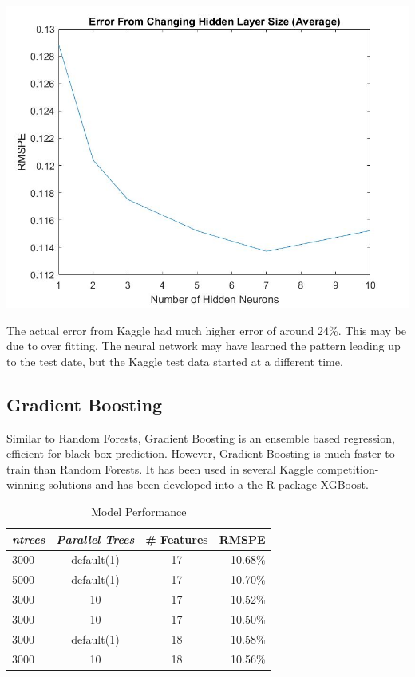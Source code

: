 \documentclass[twoside]{article}
\newenvironment{Figure}
{\par\medskip\noindent\minipage{\linewidth}}
{\endminipage\par\medskip}
\begin{document}
\begin{multicols}{2}
\begin{Figure}
    \centering
    \includegraphics[width=\linewidth]{images/hiddenAverageForceZero.jpg}
    \label{fig:RNNErrorForceZero}
\end{Figure}

The actual error from Kaggle had much higher error of around 24\%. This may be due to over fitting. The neural network may have learned the pattern leading up to the test date, but the Kaggle test data started at a different time.

\subsection{Gradient Boosting}
\indent \indent Similar to Random Forests, Gradient Boosting is an ensemble based regression, efficient for black-box prediction. However, Gradient Boosting is much faster to train than Random Forests. It has been used in several Kaggle competition-winning solutions and has been developed into a the R package XGBoost. \\
\begin{table}[H]
\caption{Model Performance}
\begin{tabular}{lccr}
\toprule
\cmidrule(r){1-4}
 \textit{ntrees} & \textit{Parallel Trees} & \# Features & RMSPE \\
\midrule
3000 & default(1) & 17 & 10.68\% \\
5000 & default(1) & 17 & 10.70\% \\
3000 & 10 & 17 & 10.52\% \\
3000 & 10 & 17 & 10.50\% \\
3000 & default(1) & 18 & 10.58\% \\
3000 & 10 & 18 & 10.56\% \\
\bottomrule
\end{tabular}
\end{table}


\end{multicols}
\end{document}

